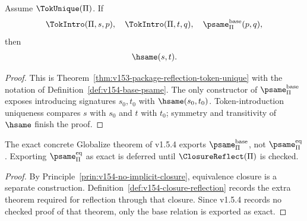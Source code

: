 \begin{theorem}
\label{thm:v154-base-reflection-active}
Assume \(\TokUnique(\Pi)\). If
\[
  \TokIntro(\Pi,s,p),\quad
  \TokIntro(\Pi,t,q),\quad
  \psame_{\Pi}^{\mathrm{base}}(p,q),
\]
then
\[
  \hsame(s,t).
\]
\end{theorem}

\begin{proof}
This is Theorem~\ref{thm:v153-package-reflection-token-unique} with the notation of Definition~\ref{def:v154-base-psame}. The only constructor of \(\psame_{\Pi}^{\mathrm{base}}\) exposes introducing signatures \(s_0,t_0\) with \(\hsame(s_0,t_0)\). Token-introduction uniqueness compares \(s\) with \(s_0\) and \(t\) with \(t_0\); symmetry and transitivity of \(\hsame\) finish the proof.
\end{proof}

\begin{corollary}
\label{cor:v154-eq-not-exported}
The exact concrete Globalize theorem of v1.5.4 exports \(\psame_{\Pi}^{\mathrm{base}}\), not \(\psame_{\Pi}^{\mathrm{eq}}\). Exporting \(\psame_{\Pi}^{\mathrm{eq}}\) as exact is deferred until \(\ClosureReflect(\Pi)\) is checked.
\end{corollary}

\begin{proof}
By Principle~\ref{prin:v154-no-implicit-closure}, equivalence closure is a separate construction. Definition~\ref{def:v154-closure-reflection} records the extra theorem required for reflection through that closure. Since v1.5.4 records no checked proof of that theorem, only the base relation is exported as exact.
\end{proof}

